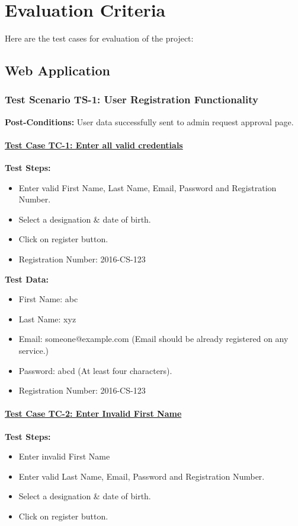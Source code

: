 
\chapter{Evaluation Criteria} %
\label{Chapter5}



Here are the test cases for evaluation of the project:
\section{Web Application}
\subsection{Test Scenario TS-1: User Registration Functionality}
\textbf{Post-Conditions: } User data successfully sent to admin request approval page.
\subsubsection{\underline{Test Case TC-1: Enter all valid credentials}}
\textbf{Test Steps:}
\begin{itemize}

\item Enter valid First Name, Last Name, Email, Password and Registration Number.
\item Select a designation \& date of birth.
\item Click on register button.
\item Registration Number: 2016-CS-123

\end{itemize}

\textbf{Test Data:}
\begin{itemize}

\item First Name: abc
\item Last Name: xyz
\item Email: someone@example.com (Email should be already registered on any service.)
\item Password: abcd (At least four characters).
\item Registration Number: 2016-CS-123

\end{itemize}

\subsubsection{\underline{Test Case TC-2: Enter Invalid First Name}}
\textbf{Test Steps:}
\begin{itemize}

\item Enter invalid First Name
\item Enter valid Last Name, Email, Password and Registration Number.
\item Select a designation \& date of birth.
\item Click on register button.

\end{itemize}

